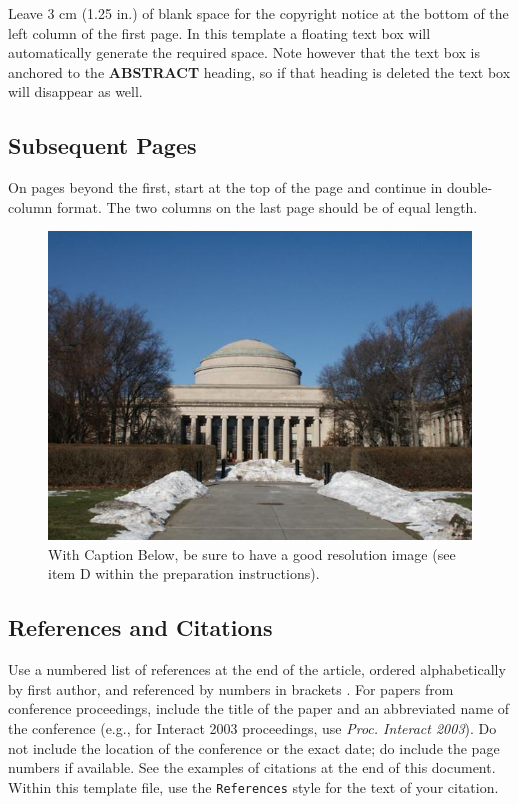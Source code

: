 \documentclass{chi2012}
\begin{document}
Leave 3 cm (1.25 in.) of blank space for the copyright notice at the
bottom of the left column of the first page. In this template a
floating text box will automatically generate the required space. Note
however that the text box is anchored to the \textbf{ABSTRACT}
heading, so if that heading is deleted the text box will disappear as
well.

\subsection{Subsequent Pages}

On pages beyond the first, start at the top of the page and continue
in double-column format.  The two columns on the last page should be
of equal length.

\begin{figure}
\centering
\includegraphics[width=0.9\columnwidth]{Figure1}
\caption{With Caption Below, be sure to have a good resolution image
  (see item D within the preparation instructions).}
\label{fig:figure1}
\end{figure}

\subsection{References and Citations}

Use a numbered list of references at the end of the article, ordered
alphabetically by first author, and referenced by numbers in brackets
\cite{ethics,
  Klemmer:2002:WSC:503376.503378,
  Mather:2000:MUT,
  Zellweger:2001:FAO:504216.504224}. For
papers from conference proceedings, include the title of the paper and
an abbreviated name of the conference (e.g., for Interact 2003
proceedings, use \textit{Proc. Interact 2003}). Do not include the
location of the conference or the exact date; do include the page
numbers if available. See the examples of citations at the end of this
document. Within this template file, use the \texttt{References} style
for the text of your citation.
\end{document}
